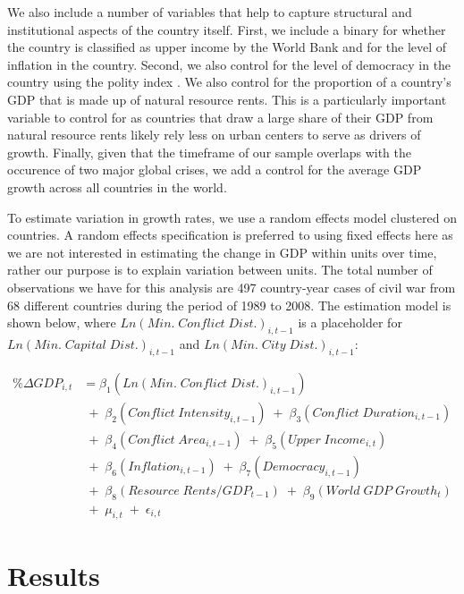 We also include a number of variables that help to capture structural and institutional aspects of the country itself. First, we include a binary for whether the country is classified as upper income by the World Bank and for the level of inflation in the country. Second, we also control for the level of democracy in the country using the polity index \citep{marshall:etal:2013}. We also control for the proportion of a country's GDP that is made up of natural resource rents. This is a particularly important variable to control for as countries that draw a large share of their GDP from natural resource rents likely rely less on urban centers to serve as drivers of growth. Finally, given that the timeframe of our sample overlaps with the occurence of two major global crises, we add a control for the average GDP growth across all countries in the world. 


To estimate variation in growth rates, we use a random effects model clustered on countries. A random effects specification is preferred to using fixed effects here as we are not interested in estimating the change in GDP within units over time, rather our purpose is to explain variation between units. The total number of observations we have for this analysis are 497 country-year cases of civil war from 68 different countries during the period of 1989 to 2008. The estimation model is shown below, where $Ln(Min. \; Conflict \; Dist.)_{i,t-1}$ is a placeholder for $Ln(Min. \; Capital \; Dist.)_{i,t-1}$ and $Ln(Min. \; City \; Dist.)_{i,t-1}$:

\begin{align*}
	\% \Delta GDP_{i,t} &= \beta_{1}(Ln(Min. \; Conflict \; Dist.)_{i,t-1}) \\
	& \;+\; \beta_{2}(Conflict \; Intensity_{i,t-1}) \;+\; \beta_{3}(Conflict \; Duration_{i,t-1}) \\
	& \;+\; \beta_{4}(Conflict \; Area_{i,t-1}) \;+\; \beta_{5}(Upper \; Income_{i,t}) \\	
	& \;+\; \beta_{6}(Inflation_{i,t-1}) \;+\; \beta_{7}(Democracy_{i,t-1}) \\
	& \;+\; \beta_{8}(Resource \; Rents/GDP_{t-1}) \;+\; \beta_{9}(World \; GDP \; Growth_{t}) \\
	& \;+\; \mu_{i,t} \;+\; \epsilon_{i,t}
\end{align*}

\section{Results}
\label{findings} 

